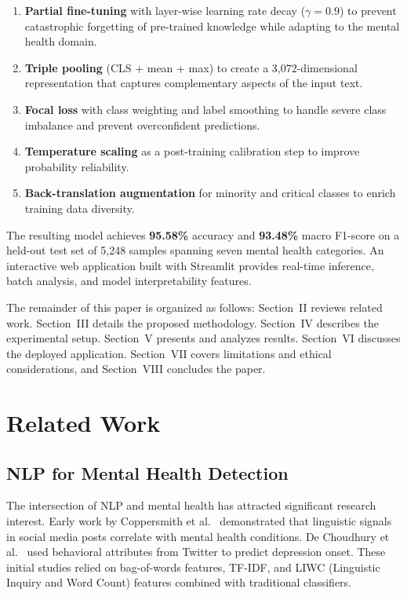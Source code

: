 \documentclass[conference, 10pt]{IEEEtran}
\begin{document}
\begin{enumerate}[noitemsep]
    \item \textbf{Partial fine-tuning} with layer-wise learning rate decay ($\gamma = 0.9$) to prevent catastrophic forgetting of pre-trained knowledge while adapting to the mental health domain.
    \item \textbf{Triple pooling} (CLS + mean + max) to create a 3,072-dimensional representation that captures complementary aspects of the input text.
    \item \textbf{Focal loss} with class weighting and label smoothing to handle severe class imbalance and prevent overconfident predictions.
    \item \textbf{Temperature scaling} as a post-training calibration step to improve probability reliability.
    \item \textbf{Back-translation augmentation} for minority and critical classes to enrich training data diversity.
\end{enumerate}

The resulting model achieves \textbf{95.58\%} accuracy and \textbf{93.48\%} macro F1-score on a held-out test set of 5,248 samples spanning seven mental health categories. An interactive web application built with Streamlit provides real-time inference, batch analysis, and model interpretability features.

The remainder of this paper is organized as follows: Section~II reviews related work. Section~III details the proposed methodology. Section~IV describes the experimental setup. Section~V presents and analyzes results. Section~VI discusses the deployed application. Section~VII covers limitations and ethical considerations, and Section~VIII concludes the paper.


\section{Related Work}

\subsection{NLP for Mental Health Detection}

The intersection of NLP and mental health has attracted significant research interest. Early work by Coppersmith et al.~\cite{coppersmith2015clpsych} demonstrated that linguistic signals in social media posts correlate with mental health conditions. De Choudhury et al.~\cite{dechoudhury2013predicting} used behavioral attributes from Twitter to predict depression onset. These initial studies relied on bag-of-words features, TF-IDF, and LIWC (Linguistic Inquiry and Word Count) features combined with traditional classifiers.
\end{document}
